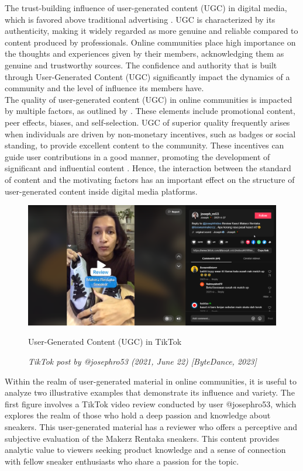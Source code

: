The trust-building influence of user-generated content (UGC) in digital media, which is favored above traditional advertising \parencite{v22}. UGC is characterized by its authenticity, making it widely regarded as more genuine and reliable compared to content produced by professionals. Online communities place high importance on the thoughts and experiences given by their members, acknowledging them as genuine and trustworthy sources. The confidence and authority that is built through User-Generated Content (UGC) significantly impact the dynamics of a community and the level of influence its members have. \\

The quality of user-generated content (UGC) in online communities is impacted by multiple factors, as outlined by \textcite{luca21}. These elements include promotional content, peer effects, biases, and self-selection. UGC of superior quality frequently arises when individuals are driven by non-monetary incentives, such as badges or social standing, to provide excellent content to the community. These incentives can guide user contributions in a good manner, promoting the development of significant and influential content \parencite{luca21}. Hence, the interaction between the standard of content and the motivating factors has an important effect on the structure of user-generated content inside digital media platforms.\pagebreak

\begin{figure}[h]
    \centering
    \includegraphics[width=0.9\linewidth]{mainmatter/images/ugc1.png}
    \caption{User-Generated Content (UGC) in TikTok}
    \caption*{\textit{TikTok post by @josephro53 (2021, June 22) [ByteDance, 2023]}}
    \label{fig:myfig3}
\end{figure}
Within the realm of user-generated material in online communities, it is useful to analyze two illustrative examples that demonstrate its influence and variety. The first figure involves a TikTok video review conducted by user @josephro53, which explores the realm of those who hold a deep passion and knowledge about sneakers. This user-generated material has a reviewer who offers a perceptive and subjective evaluation of the Makerz Rentaka sneakers. This content provides analytic value to viewers seeking product knowledge and a sense of connection with fellow sneaker enthusiasts who share a passion for the topic. \pagebreak


